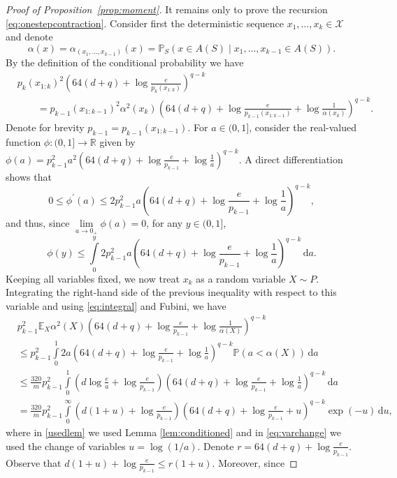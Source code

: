 \documentclass[11pt]{article}
\newcommand{\X}{\mathcal X}
\newcommand{\E}{\mathbb E}
\newcommand{\Prb}{\mathbb P}
\newcommand{\1}{\mathbf 1}
\theoremstyle{plain}
\theoremstyle{remark}
\begin{document}
\begin{proof}[Proof of Proposition~\ref{prop:moment}]
It remains only to prove the recursion \eqref{eq:onestepcontraction}. Consider first the deterministic sequence $x_1, \ldots, x_{k} \in \X$ and denote 
\[
\alpha(x)= \alpha_{(x_1, \ldots, x_{k-1})}(x)= \Prb_S(x\in A(S)\mid x_1,\ldots,x_{k-1}\in A(S)).
\]
By the definition of the conditional probability we have
\begin{align}
&p_k(x_{1:k})^2
\left(64(d+q)+\log\frac e{p_k(x_{1:k})}\right)^{q-k} \nonumber
\\
&\qquad= 
p_{k-1}(x_{1:k-1})^2\alpha^2(x_k)
\left(64(d+q)+\log\frac e{p_{k-1}(x_{1:k-1})} + \log\frac{1}{\alpha(x_k)}\right)^{q-k}. \label{eq:twopartsareequal}
\end{align}
Denote for brevity $p_{k-1}= p_{k-1}(x_{1:k-1})$. For $a \in (0, 1]$, consider the real-valued function $\phi: (0, 1] \to \mathbb{R}$ given by $\phi(a) = p_{k-1}^2a^2
\left(64(d+q)+\log\frac e{p_{k-1}} + \log\frac{1}{a}\right)^{q-k}$. A direct differentiation shows that 
\[
0 \le \phi^{\prime}(a) \le 2p_{k-1}^2a
\left(64(d+q)+\log\frac e{p_{k-1}} + \log\frac{1}{a}\right)^{q-k},
\]
and thus, since $\lim\limits_{a \to 0_+}\phi(a) = 0$, for any $y \in (0, 1]$,
\begin{equation}
\label{eq:integral}
\phi(y) \le \int\limits_{0}^y2p_{k-1}^2a
\left(64(d+q)+\log\frac e{p_{k-1}} + \log\frac{1}{a}\right)^{q-k}\,\mathrm{d}a.
\end{equation}
Keeping all variables fixed, we now treat $x_k$ as a random variable $X \sim P$. Integrating the right-hand side of the previous inequality with respect to this variable and using \eqref{eq:integral} and Fubini, we have
\begin{align}
&p_{k-1}^2\E_{X}\alpha^2(X)
\left(64(d+q)+\log\frac e{p_{k-1}} + \log\frac{1}{\alpha(X)}\right)^{q-k} \nonumber
\\
&\le p_{k-1}^2\int\limits_{0}^1 2a\left(64(d+q)+\log\frac e{p_{k-1}} + \log\frac{1}{a}\right)^{q-k}\Prb(a < \alpha(X))\,\mathrm{d}a \nonumber
\\
&\le \frac{320}{m}p_{k-1}^2\int\limits_{0}^1\left(d\log\frac ea+\log\frac e{p_{k-1}}\right)\left(64(d+q)+\log\frac e{p_{k-1}} + \log\frac{1}{a}\right)^{q-k}\,\mathrm{d}a \label{usedlem}
\\
&= \frac{320}{m}p_{k-1}^2\int\limits_{0}^\infty\left(d(1 + u)+\log\frac e{p_{k-1}}\right)\left(64(d+q)+\log\frac e{p_{k-1}} + u\right)^{q-k}\exp(-u)\,\mathrm{d} u, \label{eq:varchange}
\end{align}
where in \eqref{usedlem} we used Lemma \ref{lem:conditioned} and in \eqref{eq:varchange} we used the change of variables $u = \log(1/a)$. Denote $r = 64(d + q) + \log\frac e{p_{k-1}}$. Observe that $d(1 + u)+\log\frac{e}{p_{k-1}} \le r(1+u)$. Moreover, since

\end{proof}
\end{document}

